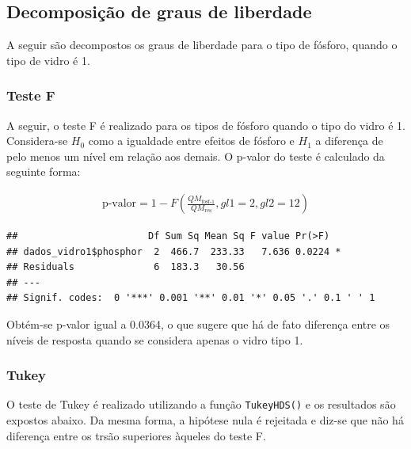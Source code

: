 \documentclass[
]{article}
\begin{document}
\hypertarget{decomposiuxe7uxe3o-de-graus-de-liberdade}{%
\subsection{Decomposição de graus de
liberdade}\label{decomposiuxe7uxe3o-de-graus-de-liberdade}}

A seguir são decompostos os graus de liberdade para o tipo de fósforo,
quando o tipo de vidro é 1.

\hypertarget{teste-f}{%
\subsubsection{Teste F}\label{teste-f}}

A seguir, o teste F é realizado para os tipos de fósforo quando o tipo
do vidro é 1. Considera-se \(H_0\) como a igualdade entre efeitos de
fósforo e \(H_1\) a diferença de pelo menos um nível em relação aos
demais. O p-valor do teste é calculado da seguinte forma:

\begin{align*}
  \text{p-valor} = 1-F\left( \frac{QM_{\text{fosf-1}}}{QM_{\text{res}}}, gl1 = 2, gl2 = 12 \right)
\end{align*}

\begin{verbatim}
##                       Df Sum Sq Mean Sq F value Pr(>F)  
## dados_vidro1$phosphor  2  466.7  233.33   7.636 0.0224 *
## Residuals              6  183.3   30.56                 
## ---
## Signif. codes:  0 '***' 0.001 '**' 0.01 '*' 0.05 '.' 0.1 ' ' 1
\end{verbatim}

Obtém-se p-valor igual a 0.0364, o que sugere que há de fato diferença
entre os níveis de resposta quando se considera apenas o vidro tipo 1.

\hypertarget{tukey}{%
\subsubsection{Tukey}\label{tukey}}

O teste de Tukey é realizado utilizando a função \texttt{TukeyHDS()} e
os resultados são expostos abaixo. Da mesma forma, a hipótese nula é
rejeitada e diz-se que não há diferença entre os trsão superiores
àqueles do teste F.
\end{document}
